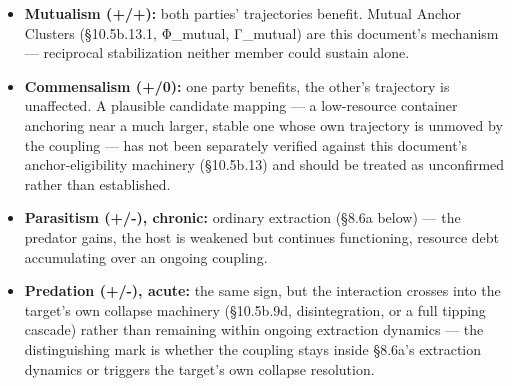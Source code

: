 \documentclass[
]{article}
\begin{document}
\begin{itemize}
\item
  \textbf{Mutualism (+/+):} both parties' trajectories benefit. Mutual
  Anchor Clusters (§10.5b.13.1, Φ\_mutual, Γ\_mutual) are this
  document's mechanism --- reciprocal stabilization neither member could
  sustain alone.
\item
  \textbf{Commensalism (+/0):} one party benefits, the other's
  trajectory is unaffected. A plausible candidate mapping --- a
  low-resource container anchoring near a much larger, stable one whose
  own trajectory is unmoved by the coupling --- has not been separately
  verified against this document's anchor-eligibility machinery
  (§10.5b.13) and should be treated as unconfirmed rather than
  established.
\item
  \textbf{Parasitism (+/-), chronic:} ordinary extraction (§8.6a below)
  --- the predator gains, the host is weakened but continues
  functioning, resource debt accumulating over an ongoing coupling.
\item
  \textbf{Predation (+/-), acute:} the same sign, but the interaction
  crosses into the target's own collapse machinery (§10.5b.9d,
  disintegration, or a full tipping cascade) rather than remaining
  within ongoing extraction dynamics --- the distinguishing mark is
  whether the coupling stays inside §8.6a's extraction dynamics or
  triggers the target's own collapse resolution.
\end{itemize}
\end{document}
